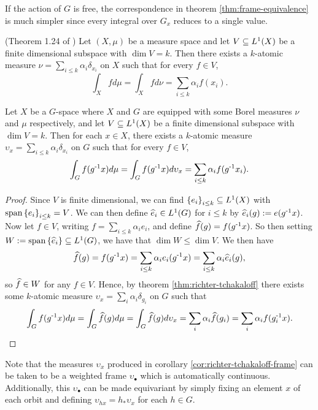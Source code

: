 \begin{remark}
    If the action of $G$ is free, the correspondence in theorem \ref{thm:frame-equivalence} is much simpler since every integral over $G_x$ reduces to a single value.
\end{remark}

\begin{theorem}\label{thm:richter-tchakaloff}
    (Theorem 1.24 of \cite{schmudgen2017momentproblem})
    Let $(X,\mu)$ be a measure space and let $V \sub L^1(X)$ be a finite dimensional subspace with $\dim V = k$.
    Then there exists a $k$-atomic measure $\nu = \sum_{i \leq k} \alpha_i \delta_{x_i}$ on $X$ such that for every $f \in V$,
    \[
        \int_X f d \mu
        = \int_X f d \nu
        = \sum_{i \leq k} \alpha_i f(x_i).
    \]
\end{theorem}


\begin{corollary}\label{cor:richter-tchakaloff-frame}
    Let $X$ be a $G$-space where $X$ and $G$ are equipped with some Borel measures $\nu$ and $\mu$ respectively, and let $V \sub L^1(X)$ be a finite dimensional subspace with $\dim V = k$.
    Then for each $x \in X$, there exists a $k$-atomic measure $\upsilon_x = \sum_{i \leq k} \alpha_i \delta_{x_i}$ on $G$ such that for every $f \in V$,
    \[
        \int_G f (\inv{g} x) d \mu
        = \int_G f (\inv {g} x) d \upsilon_x
        = \sum_{i \leq k} \alpha_i f(\inv{g} x_i).
    \]
    \begin{proof}
        Since $V$ is finite dimensional, we can find $\set{e_i}_{i \leq k} \sub L^1(X)$ with $\Span \set{e_i}_{i \leq k} = V$.
        We can then define $\Hat{e}_i \in L^1(G)$ for $i \leq k$ by $\Hat{e}_i (g) := e(\inv{g} x)$.
        Now let $f \in V$, writing $f = \sum_{i \leq k} \alpha_i e_i$, and define $\Hat{f}(g) = f(\inv{g} x)$.
        So then setting $W := \Span \set{\Hat{e}_i} \sub L^1 (G)$, we have that $\dim W \leq \dim V$.
        We then have
        \[
            \Hat{f}(g)
            = f(\inv{g} x)
            = \sum_{i \leq k} \alpha_i e_i(\inv{g} x)
            = \sum_{i \leq k} \alpha_i \Hat{e}_i(g),
        \]
        so $\Hat{f} \in W$ for any $f \in V$.
        Hence, by theorem \ref{thm:richter-tchakaloff} there exists some $k$-atomic measure $\upsilon_x = \sum_i \alpha_i \delta_{g_i}$ on $G$ such that
        \[
            \int_G f(\inv{g} x) d \mu
            = \int_G \Hat{f}(g) d \mu
            = \int_G \Hat{f}(g) d \upsilon_x
            = \sum_i \alpha_i \Hat{f}(g_i)
            = \sum_i \alpha_i f(\inv{g_i} x).
        \]
    \end{proof}
\end{corollary}


\begin{remark}
    Note that the measures $\upsilon_x$ produced in corollary \ref{cor:richter-tchakaloff-frame} can be taken to be a weighted frame $\upsilon_\bullet$ which is automatically continuous.
    Additionally, this $\upsilon_\bullet$ can be made equivariant by simply fixing an element $x$ of each orbit and defining $\upsilon_{hx} = h_* \upsilon_x$ for each $h \in G$.
\end{remark}